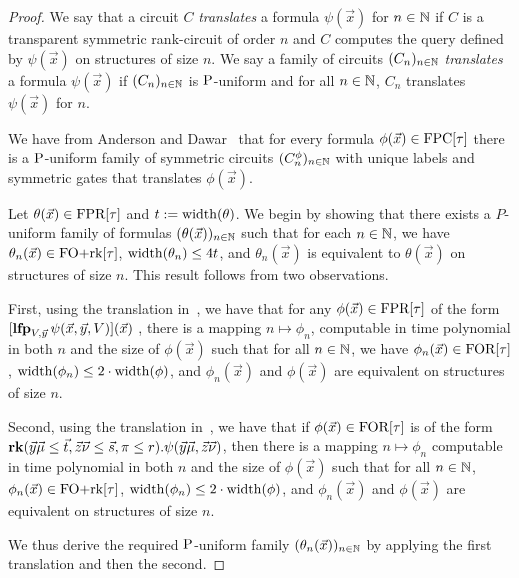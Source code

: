 \documentclass[../paper.tex]{subfiles}
\begin{document}
\begin{proof}
  We say that a circuit $C$ \emph{translates} a formula $\psi(\vec{x})$ for $n
  \in \mathbb{N}$ if $C$ is a transparent symmetric rank-circuit of order $n$ and $C$
  computes the query defined by $\psi(\vec{x})$ on structures of size $n$. We
  say a family of circuits $(C_n)_{n \in \mathbb{N}}$ \emph{translates} a formula
  $\psi (\vec{x})$ if $(C_n)_{n \in \mathbb{N}}$ is $\mathrm{P}$-uniform and for all $n \in
  \mathbb{N}$, $C_n$ translates $\psi(\vec{x})$ for $n$.

  We have from Anderson and Dawar~\cite{AndersonD17} that for every formula
  $\phi(\vec{x}) \in \text{\upshape FPC}[\tau]$ there is a $\mathrm{P}$-uniform family of symmetric
  circuits $(C^{\phi}_n)_{n \in \mathbb{N}}$ with unique labels and symmetric gates
  that translates $\phi(\vec{x})$.
  
  Let $\theta(\vec{x}) \in \text{\upshape FPR}[\tau]$ and $t := \mathrm{width} (\theta)$. We begin by
  showing that there exists a $P$-uniform family of formulas
  $(\theta(\vec{x}))_{n \in \mathbb{N}}$ such that for each $n \in \mathbb{N}$, we have
  $\theta_n(\vec{x}) \in \text{\upshape FO+rk}[\tau]$, $\mathrm{width}(\theta_n) \leq 4 t$, and
  $\theta_n(\vec{x})$ is equivalent to $\theta(\vec{x})$ on structures of size
  $n$. This result follows from two observations.

  First, using the translation in~\cite{Dawar09logicswith}, we have that for any
  $\phi(\vec{x}) \in \text{\upshape FPR}[\tau]$ of the form $[\text{\textbf{lfp}}_{V, \vec{y}} \, \psi(\vec{x},
    \vec{y}, V) ](\vec{x})$ , there is a mapping $n \mapsto \phi_n$, computable
  in time polynomial in both $n$ and the size of $\phi(\vec{x})$ such that for
  all $n \in \mathbb{N}$, we have $\phi_n(\vec{x}) \in \text{\upshape FOR}[\tau]$, $\mathrm{width} (\phi_n)
  \leq 2 \cdot \mathrm{width} (\phi)$, and $\phi_n(\vec{x})$ and $\phi(\vec{x})$ are
  equivalent on structures of size $n$.

  Second, using the translation in~\cite{libkin2004elements}, we have that if
  $\phi (\vec{x}) \in \text{\upshape FOR}[\tau]$ is of the form $\text{\textbf{rk}} (\vec{y}\vec{\mu} \leq
  \vec{t}, \vec{z}\vec{\nu} \leq \vec{s}, \pi \leq r) . \psi (\vec{y}\vec{\mu},
  \vec{z} \vec{\nu})$, then there is a mapping $n \mapsto \phi_n$ computable in
  time polynomial in both $n$ and the size of $\phi(\vec{x})$ such that for all
  $n \in \mathbb{N}$, $\phi_n(\vec{x}) \in \text{\upshape FO+rk}[\tau]$, $\mathrm{width}(\phi_n) \leq 2 \cdot
  \mathrm{width}(\phi)$, and $\phi_n(\vec{x})$ and $\phi(\vec{x})$ are equivalent on
  structures of size $n$.

  We thus derive the required $\mathrm{P}$-uniform family $(\theta_n(\vec{x}))_{n \in
    \mathbb{N}}$ by applying the first translation and then the second.


\end{proof}
\end{document}
